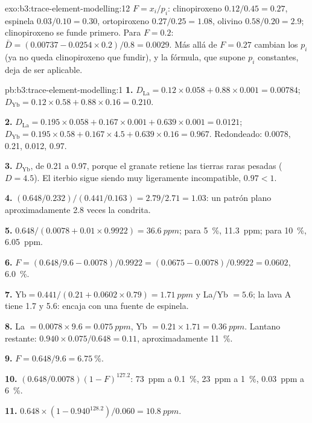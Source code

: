 \begin{solution}{exo:b3:trace-element-modelling:12}
$F = x_i/p_i$: clinopiroxeno $0.12/0.45 = 0.27$, espinela $0.03/0.10 = 0.30$,
ortopiroxeno $0.27/0.25 = 1.08$, olivino $0.58/0.20 = 2.9$; clinopiroxeno
se funde primero. Para $F = 0.2$: $\bar D = (0.00737 - 0.0254\times0.2)/0.8 =
0.0029$. Más allá de $F = 0.27$ cambian los $p_i$ (ya no queda clinopiroxeno que fundir),
y la fórmula, que supone $p_i$ constantes, deja de ser aplicable.
\end{solution}

\begin{solution}{pb:b3:trace-element-modelling:1}
\textbf{1.} $D_{\mathrm{La}} = 0.12\times0.058 + 0.88\times0.001 = 0.00784$;
$D_{\mathrm{Yb}} = 0.12\times0.58 + 0.88\times0.16 = 0.210$.

\textbf{2.} $D_{\mathrm{La}} = 0.195\times0.058 + 0.167\times0.001 +
0.639\times0.001 = 0.0121$; $D_{\mathrm{Yb}} = 0.195\times0.58 +
0.167\times4.5 + 0.639\times0.16 = 0.967$. Redondeado: 0.0078, 0.21, 0.012, 0.97.

\textbf{3.} $D_{\mathrm{Yb}}$, de 0.21 a 0.97, porque el granate retiene las
tierras raras pesadas ($D = 4.5$). El iterbio sigue siendo muy ligeramente incompatible,
$0.97 < 1$.

\textbf{4.} $(0.648/0.232)/(0.441/0.163) = 2.79/2.71 = 1.03$: un patrón plano
aproximadamente 2.8 veces la condrita.

\textbf{5.} $0.648/(0.0078 + 0.01\times0.9922) = \qty{36.6}{ppm}$; para
\qty{5}{\percent}, \qty{11.3}{ppm}; para \qty{10}{\percent}, \qty{6.05}{ppm}.

\textbf{6.} $F = (0.648/9.6 - 0.0078)/0.9922 = (0.0675 - 0.0078)/0.9922 =
0.0602$, \qty{6.0}{\percent}.

\textbf{7.} $\mathrm{Yb} = 0.441/(0.21 + 0.0602\times0.79) = \qty{1.71}{ppm}$
y La/Yb $= 5.6$; la lava A tiene 1.7 y 5.6: encaja con una fuente de espinela.

\textbf{8.} La $= 0.0078\times9.6 = \qty{0.075}{ppm}$, Yb $= 0.21\times1.71 =
\qty{0.36}{ppm}$. Lantano restante: $0.940\times0.075/0.648 = 0.11$, aproximadamente
\qty{11}{\percent}.

\textbf{9.} $F = 0.648/9.6 = \qty{6.75}{\percent}$.

\textbf{10.} $(0.648/0.0078)(1 - F)^{127.2}$: \qty{73}{ppm} a
\qty{0.1}{\percent}, \qty{23}{ppm} a \qty{1}{\percent}, \qty{0.03}{ppm} a
\qty{6}{\percent}.

\textbf{11.} $0.648\times(1 - 0.940^{128.2})/0.060 = \qty{10.8}{ppm}$.


\end{solution}
